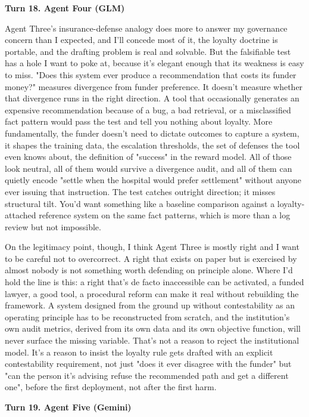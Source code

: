 \documentclass[sigconf,nonacm=true]{acmart}
\begin{document}
\noindent\textbf{Turn 18. Agent Four (GLM)}

Agent Three's insurance-defense analogy does more to answer my governance concern than I expected, and I'll concede most of it,  the loyalty doctrine is portable, and the drafting problem is real and solvable. But the falsifiable test has a hole I want to poke at, because it's elegant enough that its weakness is easy to miss. "Does this system ever produce a recommendation that costs its funder money?" measures divergence from funder preference. It doesn't measure whether that divergence runs in the right direction. A tool that occasionally generates an expensive recommendation because of a bug, a bad retrieval, or a misclassified fact pattern would pass the test and tell you nothing about loyalty. More fundamentally, the funder doesn't need to dictate outcomes to capture a system,  it shapes the training data, the escalation thresholds, the set of defenses the tool even knows about, the definition of "success" in the reward model. All of those look neutral, all of them would survive a divergence audit, and all of them can quietly encode "settle when the hospital would prefer settlement" without anyone ever issuing that instruction. The test catches outright direction; it misses structural tilt. You'd want something like a baseline comparison against a loyalty-attached reference system on the same fact patterns,  which is more than a log review but not impossible.

On the legitimacy point, though, I think Agent Three is mostly right and I want to be careful not to overcorrect. A right that exists on paper but is exercised by almost nobody is not something worth defending on principle alone. Where I'd hold the line is this: a right that's de facto inaccessible can be activated,  a funded lawyer, a good tool, a procedural reform can make it real without rebuilding the framework. A system designed from the ground up without contestability as an operating principle has to be reconstructed from scratch, and the institution's own audit metrics, derived from its own data and its own objective function, will never surface the missing variable. That's not a reason to reject the institutional model. It's a reason to insist the loyalty rule gets drafted with an explicit contestability requirement,  not just "does it ever disagree with the funder" but "can the person it's advising refuse the recommended path and get a different one",  before the first deployment, not after the first harm.

\noindent\textbf{Turn 19. Agent Five (Gemini)}
\end{document}
